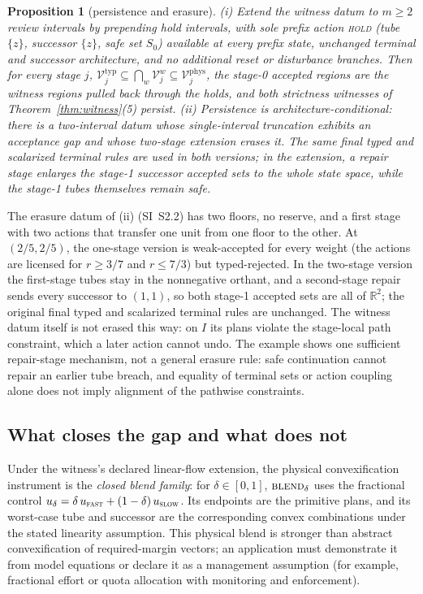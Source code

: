 \documentclass[preprint,11pt,authoryear]{elsarticle}
\newtheorem{proposition}{Proposition}
\theoremstyle{definition}
\theoremstyle{remark}
\newcommand{\act}[1]{\textsc{#1}}
\begin{document}
\begin{proposition}[persistence and erasure]\label{prop:persist}
\textup{(i)} Extend the witness datum to $m\ge2$ review intervals by prepending hold intervals, with sole prefix action \act{hold} (tube $\{z\}$, successor $\{z\}$, safe set $S_0$) available at every prefix state, unchanged terminal and successor architecture, and no additional reset or disturbance branches. Then for every stage $j$, $\mathcal V^{\mathrm{typ}}_j\subseteq\bigcap_{w}\mathcal V^{w}_j\subseteq\mathcal V^{\mathrm{phys}}_j$, the stage-0 accepted regions are the witness regions pulled back through the holds, and both strictness witnesses of Theorem~\ref{thm:witness}(5) persist.
\textup{(ii)} Persistence is architecture-conditional: there is a two-interval datum whose single-interval truncation exhibits an acceptance gap and whose two-stage extension erases it. The same final typed and scalarized terminal rules are used in both versions; in the extension, a repair stage enlarges the stage-1 successor accepted sets to the whole state space, while the stage-1 tubes themselves remain safe.
\end{proposition}

The erasure datum of (ii) (SI~S2.2) has two floors, no reserve, and a first stage with two actions that transfer one unit from one floor to the other. At $(2/5,2/5)$, the one-stage version is weak-accepted for every weight (the actions are licensed for $r\ge3/7$ and $r\le7/3$) but typed-rejected. In the two-stage version the first-stage tubes stay in the nonnegative orthant, and a second-stage repair sends every successor to $(1,1)$, so both stage-1 accepted sets are all of $\mathbb R^2$; the original final typed and scalarized terminal rules are unchanged. The witness datum itself is not erased this way: on $I$ its plans violate the stage-local path constraint, which a later action cannot undo. The example shows one sufficient repair-stage mechanism, not a general erasure rule: safe continuation cannot repair an earlier tube breach, and equality of terminal sets or action coupling alone does not imply alignment of the pathwise constraints.

\subsection{What closes the gap and what does not}\label{sec:closing}

Under the witness's declared linear-flow extension, the physical convexification instrument is the \emph{closed blend family}: for $\delta\in[0,1]$, $\act{blend}_\delta$ uses the fractional control $u_\delta=\delta\,u_{\act{fast}}+(1-\delta)\,u_{\act{slow}}$. Its endpoints are the primitive plans, and its worst-case tube and successor are the corresponding convex combinations under the stated linearity assumption. This physical blend is stronger than abstract convexification of required-margin vectors; an application must demonstrate it from model equations or declare it as a management assumption (for example, fractional effort or quota allocation with monitoring and enforcement).
\end{document}

